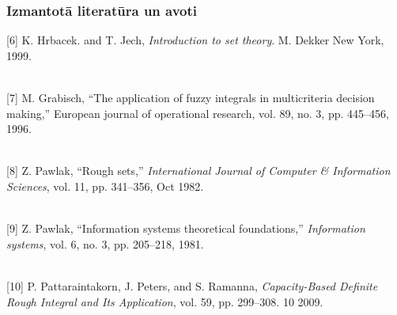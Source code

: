 \documentclass{beamer}
\theoremstyle{definition}
\begin{document}
\begin{frame}
\frametitle{Izmantotā literatūra un avoti}
\small
[6] K. Hrbacek. and T. Jech, \textit{Introduction to set theory}. M. Dekker New York, 1999.\\~

[7] M. Grabisch, “The application of fuzzy integrals in multicriteria decision making,”
European journal of operational research, vol. 89, no. 3, pp. 445–456, 1996.\\~

[8] Z. Pawlak, “Rough sets,” \textit{International Journal of Computer \& Information Sciences},
vol. 11, pp. 341–356, Oct 1982.\\~

[9] Z. Pawlak, “Information systems theoretical foundations,” \textit{Information systems},
vol. 6, no. 3, pp. 205–218, 1981.\\~

[10] P. Pattaraintakorn, J. Peters, and S. Ramanna,\textit{ Capacity-Based Definite Rough Integral and Its Application}, vol. 59, pp. 299–308. 10 2009.
\end{frame}
\end{document}
